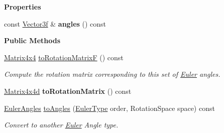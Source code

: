 \begin{Indent}\textbf{ Properties}\par
\begin{DoxyCompactItemize}
\item 
\mbox{\label{classrev_1_1_euler_angles_a28babc1055f2720b936b7c462cc17462}} 
const \mbox{\hyperlink{classrev_1_1_vector}{Vector3f}} \& {\bfseries angles} () const
\end{DoxyCompactItemize}
\end{Indent}
\begin{Indent}\textbf{ Public Methods}\par
\begin{DoxyCompactItemize}
\item 
\mbox{\label{classrev_1_1_euler_angles_a5f9fce82e6a981d5183683f47768dec5}} 
\mbox{\hyperlink{classrev_1_1_square_matrix}{Matrix4x4}} \mbox{\hyperlink{classrev_1_1_euler_angles_a5f9fce82e6a981d5183683f47768dec5}{to\+Rotation\+MatrixF}} () const
\begin{DoxyCompactList}\small\item\em Compute the rotation matrix corresponding to this set of \mbox{\hyperlink{class_euler}{Euler}} angles. \end{DoxyCompactList}\item 
\mbox{\label{classrev_1_1_euler_angles_a9219fb02fd953237778e019f7da9eb51}} 
\mbox{\hyperlink{classrev_1_1_square_matrix}{Matrix4x4d}} {\bfseries to\+Rotation\+Matrix} () const
\item 
\mbox{\label{classrev_1_1_euler_angles_a93d80880e850c3b5ed16a0bbab8ce78b}} 
\mbox{\hyperlink{classrev_1_1_euler_angles}{Euler\+Angles}} \mbox{\hyperlink{classrev_1_1_euler_angles_a93d80880e850c3b5ed16a0bbab8ce78b}{to\+Angles}} (\mbox{\hyperlink{classrev_1_1_euler_angles_a27302602f4b1e12892749e201df3d52d}{Euler\+Type}} order, Rotation\+Space space) const
\begin{DoxyCompactList}\small\item\em Convert to another \mbox{\hyperlink{class_euler}{Euler}} Angle type. \end{DoxyCompactList}\item 
\mbox{\label{classrev_1_1_euler_angles_a1603ef7a718dfd42679fd2436d8cd389}} 

\end{DoxyCompactItemize}
\end{Indent}
